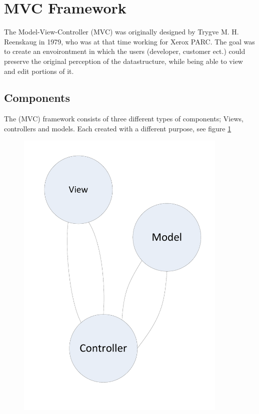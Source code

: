 \section{MVC Framework}
\label{sec:mvc}
The Model-View-Controller (MVC) was originally designed by Trygve M. H. Reenskaug in 1979, who was at that time working for Xerox PARC. The goal was to create an envoirontment in which the users (developer, customer ect.) could preserve the original perception of the datastructure, while being able to view and edit portions of it.

\subsection{Components}

The (MVC) framework consists of three different types of components; Views, controllers and models. Each created with a different purpose, see figure \ref{fig:mvc-drawing}

\begin{figure}[h]
	\centering
		\includegraphics[width=0.90\textwidth]{input/implementation/mvc/MVC.pdf}
	\label{fig:mvc-drawing}
\end{figure}


